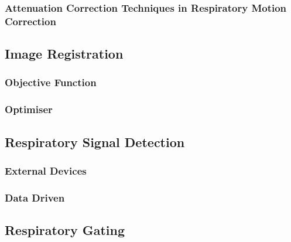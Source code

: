             \subsubsection{Attenuation Correction Techniques in Respiratory Motion Correction} \label{attenuation_correction_techniques_in_respiratory_motion_correction}
                \blindtext
    
        \blindtext
    
        \subsection{Image Registration} \label{image_registration}
            \blindtext
            
            \subsubsection{Objective Function} \label{image_registration_objective_function}
                \blindtext
                
            \subsubsection{Optimiser} \label{image_registration_optimiser}
                \blindtext
            
        \subsection{Respiratory Signal Detection} \label{respiratory_signal_detection}
            \blindtext
            
            \subsubsection{External Devices} \label{external_devices}
                \blindtext
                
            \subsubsection{Data Driven} \label{data_driven}
                \blindtext
                
        \subsection{Respiratory Gating} \label{respiratory_gating}
            \blindtext
            
